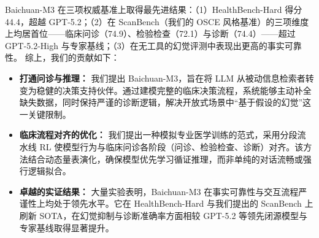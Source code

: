 Baichuan-M3 在三项权威基准上取得最先进结果：（1）HealthBench-Hard 得分 44.4，超越 GPT-5.2；（2）在 ScanBench（我们的 OSCE 风格基准）的三项维度上均居首位——临床问诊（74.9）、检验检查（72.1）与诊断（74.4）——超过 GPT-5.2-High 与专家基线；（3）在无工具的幻觉评测中表现出更高的事实可靠性。
综上，我们的贡献如下：
\begin{itemize}
    \item \textbf{打通问诊与推理：} 我们提出 Baichuan-M3，旨在将 LLM 从被动信息检索者转变为稳健的决策支持伙伴。通过建模完整的临床决策流程，系统能够主动补全缺失数据，同时保持严谨的诊断逻辑，解决开放式场景中“基于假设的幻觉”这一关键限制。

    \item  \textbf{临床流程对齐的优化：} 我们提出一种模拟专业医学训练的范式，采用分段流水线 RL 使模型行为与临床问诊各阶段（问诊、检验检查、诊断）对齐。该方法结合动态量表演化，确保模型优先学习循证推理，而非单纯的对话流畅或强行逻辑拟合。

    \item \textbf{卓越的实证结果：} 大量实验表明，Baichuan-M3 在事实可靠性与交互流程严谨性上均处于领先水平。它在 HealthBench-Hard 与我们提出的 ScanBench 上刷新 SOTA，在幻觉抑制与诊断准确率方面相较 GPT-5.2 等领先闭源模型与专家基线取得显著提升。
\end{itemize}